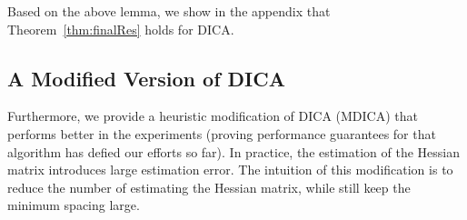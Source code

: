 \documentclass[jmlr]{article}
\newcommand{\Ephione}{\mathcal{E}_{\phi_1}}
\newcommand{\E}{\mathbb{E}}
\newtheorem{lemma}{Lemma}[section]
\theoremstyle{definition}
\newtheorem{remark}[lemma]{Remark}
\begin{document}
Based on the above lemma, we show in the appendix that Theorem~\ref{thm:finalRes} holds for DICA.


\subsection{A Modified Version of DICA}
\label{subsec:modifiedDICA}
Furthermore, we provide a heuristic modification of DICA (MDICA) that performs better in the experiments (proving performance guarantees for that algorithm has defied our efforts so far). 
In practice, the estimation of the Hessian matrix introduces large estimation error.
The intuition of this modification is to reduce the number of estimating the Hessian matrix, while still keep the minimum spacing large.

\end{document}
